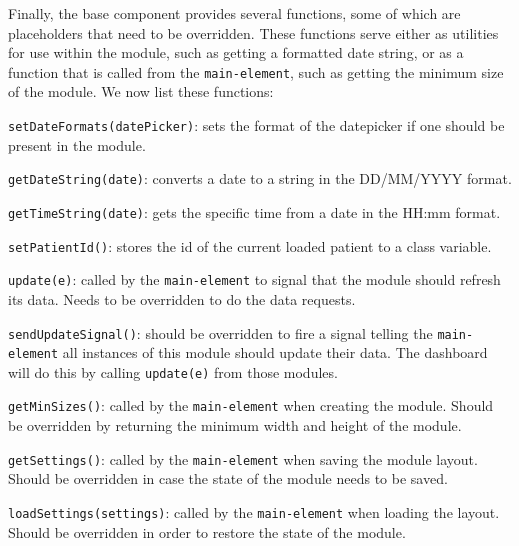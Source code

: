             \noindent Finally, the base component provides several functions, some of which are placeholders that need to be overridden. These functions serve either as utilities for use within the module, such as getting a formatted date string, or as a function that is called from the \texttt{main-element}, such as getting the minimum size of the module. We now list these functions:
            \vspace{-6pt}
            \begin{myitemize}
                \item \texttt{setDateFormats(datePicker)}: sets the format of the datepicker if one should be present in the module.
                \item \texttt{getDateString(date)}: converts a date to a string in the DD/MM/YYYY format.
                \item \texttt{getTimeString(date)}: gets the specific time from a date in the HH:mm format.
                \item \texttt{setPatientId()}: stores the id of the current loaded patient to a class variable.
                \item \texttt{update(e)}: called by the \texttt{main-element} to signal that the module should refresh its data. Needs to be overridden to do the data requests.
                \item \texttt{sendUpdateSignal()}: should be overridden to fire a signal telling the \texttt{main-element} all instances of this module should update their data. The dashboard will do this by calling \texttt{update(e)} from those modules.
                \item \texttt{getMinSizes()}: called by the \texttt{main-element} when creating the module. Should be overridden by returning the minimum width and height of the module.
                \item \texttt{getSettings()}: called by the \texttt{main-element} when saving the module layout. Should be overridden in case the state of the module needs to be saved.
                \item \texttt{loadSettings(settings)}: called by the \texttt{main-element} when loading the layout. Should be overridden in order to restore the state of the module.
            \end{myitemize}

